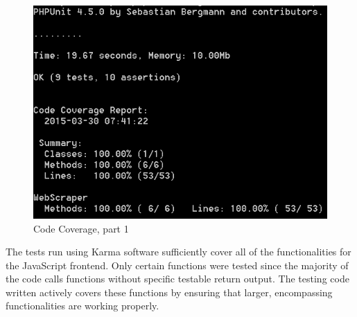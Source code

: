 \documentclass[]{article}
\begin{document}
\begin{figure}[htbp]
\centering
\includegraphics{coverage1.png}
\caption{Code Coverage, part 1}
\end{figure}

The tests run using Karma software sufficiently cover all of the
functionalities for the JavaScript frontend. Only certain functions were
tested since the majority of the code calls functions without specific
testable return output. The testing code written actively covers these
functions by ensuring that larger, encompassing functionalities are
working properly.
\end{document}
